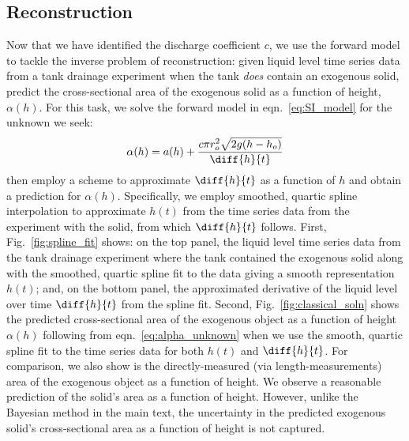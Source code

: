 \documentclass[a4paper,fleqn]{cas-sc}
\begin{document}
 \subsection{Reconstruction}
Now that we have identified the discharge coefficient $c$, we use the forward model to tackle the inverse problem of reconstruction: given liquid level time series data from a tank drainage experiment when the tank \emph{does} contain an exogenous solid, predict the cross-sectional area of the exogenous solid as a function of height, $\alpha(h)$. For this task, we solve the forward model in eqn.~\ref{eq:SI_model} for the unknown we seek:
\begin{equation}
\alpha(h) = a(h) +  \frac{c \pi r_o^2 \sqrt{2g (h-h_o)}}{\diff{h}{t}} \label{eq:alpha_unknown}
\end{equation} then
employ a scheme to approximate $\diff{h}{t}$ as a function of $h$ and obtain a prediction for $\alpha(h)$. Specifically, we employ smoothed, quartic spline interpolation to approximate $h(t)$ from the time series data from the experiment with the solid, from which $\diff{h}{t}$ follows.
First, Fig.~\ref{fig:spline_fit} shows: on the top panel, the liquid level time series data from the tank drainage experiment where the tank contained the exogenous solid along with the smoothed, quartic spline fit to the data giving a smooth representation $h(t)$; and, on the bottom panel, the approximated derivative of the liquid level over time $\diff{h}{t}$ from the spline fit. 
Second, Fig.~\ref{fig:classical_soln} shows the predicted cross-sectional area of the exogenous object as a function of height $\alpha(h)$ following from eqn.~\ref{eq:alpha_unknown} when we use the smooth, quartic spline fit to the time series data for both $h(t)$ and $\diff{h}{t}$. For comparison, we also show is the directly-measured (via length-measurements) area of the exogenous object as a function of height. 
We observe a reasonable prediction of the solid's area as a function of height. 
However, unlike the Bayesian method in the main text, the uncertainty in the predicted exogenous solid's cross-sectional area as a function of height is not captured.
\end{document}
